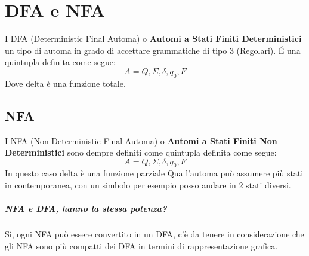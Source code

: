 \chapter{DFA e NFA}
I DFA (Deterministic Final Automa) o \textbf{Automi a Stati Finiti Deterministici} un tipo di automa in grado
di accettare grammatiche di tipo 3 (Regolari).
\'E una quintupla definita come segue:
\begin{equation*}
    A={Q, \Sigma, \delta, q_0, F}    
\end{equation*}
Dove delta è una funzione totale.
\section{NFA}
I NFA (Non Deterministic Final Automa) o \textbf{Automi a Stati Finiti Non Deterministici} sono dempre definiti
come quintupla definita come segue:
\begin{equation*}
    A={Q, \Sigma, \delta, q_0, F}    
\end{equation*}
In questo caso delta è una funzione parziale
Qua l'automa può assumere più stati in contemporanea, con un simbolo per
esempio posso andare in 2 stati diversi.
\paragraph*{NFA e DFA, hanno la stessa potenza?} Sì, ogni NFA può essere convertito in un DFA, 
c'è da tenere in considerazione che gli NFA sono più compatti dei DFA in termini di rappresentazione
grafica.
